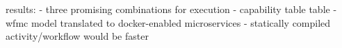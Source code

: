 
results:
  - three promising combinations for execution
  - capability table table
  - wfmc model translated to docker-enabled microservices
  - statically compiled activity/workflow would be faster

